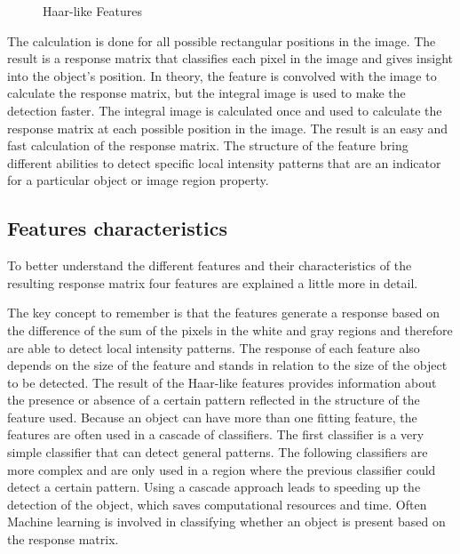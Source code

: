 \begin{figure}[h]
    \caption{Haar-like Features}
    \label{fig:haar_features}
\end{figure}

The calculation is done for all possible rectangular positions in the image. The result is a response matrix that classifies each pixel in the image and gives insight into the object's position. In theory, the feature is convolved with the image to calculate the response matrix, but the integral image is used to make the detection faster. The integral image is calculated once and used to calculate the response matrix at each possible position in the image.
The result is an easy and fast calculation of the response matrix. 
The structure of the feature bring different abilities to detect specific local intensity patterns that are an indicator for a particular object or image region property. 
\subsection{Features characteristics}
To better understand the different features and their characteristics of the resulting response matrix four features are explained a little more in detail. 

The key concept to remember is that the features generate a response based on the difference of the sum of the pixels in the white and gray regions and therefore are able to detect local intensity patterns. The response of each feature also depends on the size of the feature and stands in relation to the size of the object to be detected. The result of the Haar-like features provides information about the presence or absence of a certain pattern reflected in the structure of the feature used. Because an object can have more than one fitting feature, the features are often used in a cascade of classifiers. The first classifier is a very simple classifier that can detect general patterns. The following classifiers are more complex and are only used in a region where the previous classifier could detect a certain pattern. Using a cascade approach leads to speeding up the detection of the object, which saves computational resources and time. Often Machine learning is involved in classifying whether an object is present based on the response matrix. 


